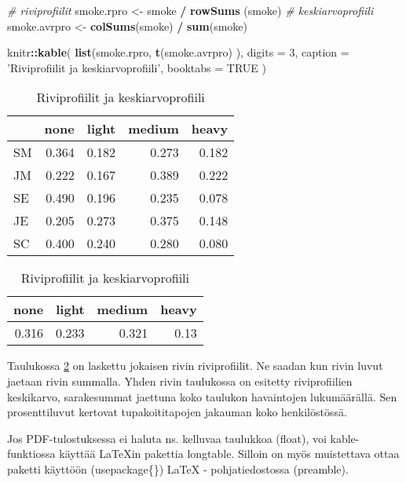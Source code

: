 \documentclass[finnish,]{book}
\newenvironment{Shaded}{\begin{snugshade}}{\end{snugshade}}
\newcommand{\CommentTok}[1]{\textcolor[rgb]{0.56,0.35,0.01}{\textit{#1}}}
\newcommand{\DataTypeTok}[1]{\textcolor[rgb]{0.13,0.29,0.53}{#1}}
\newcommand{\DecValTok}[1]{\textcolor[rgb]{0.00,0.00,0.81}{#1}}
\newcommand{\KeywordTok}[1]{\textcolor[rgb]{0.13,0.29,0.53}{\textbf{#1}}}
\newcommand{\NormalTok}[1]{#1}
\newcommand{\OperatorTok}[1]{\textcolor[rgb]{0.81,0.36,0.00}{\textbf{#1}}}
\newcommand{\OtherTok}[1]{\textcolor[rgb]{0.56,0.35,0.01}{#1}}
\newcommand{\StringTok}[1]{\textcolor[rgb]{0.31,0.60,0.02}{#1}}
\theoremstyle{definition}
\theoremstyle{definition}
\theoremstyle{definition}
\theoremstyle{remark}
\begin{document}
\begin{Shaded}
\begin{Highlighting}[]
\CommentTok{# riviprofiilit}
\NormalTok{smoke.rpro <-}\StringTok{ }\NormalTok{smoke }\OperatorTok{/}\StringTok{ }\KeywordTok{rowSums}\NormalTok{ (smoke)}
\CommentTok{# keskiarvoprofiili}
\NormalTok{smoke.avrpro <-}\StringTok{ }\KeywordTok{colSums}\NormalTok{(smoke) }\OperatorTok{/}\StringTok{ }\KeywordTok{sum}\NormalTok{(smoke)}

\NormalTok{knitr}\OperatorTok{::}\KeywordTok{kable}\NormalTok{(}
  \KeywordTok{list}\NormalTok{(smoke.rpro, }\KeywordTok{t}\NormalTok{(smoke.avrpro)   ), }\DataTypeTok{digits =} \DecValTok{3}\NormalTok{,}
  \DataTypeTok{caption =} \StringTok{'Riviprofiilit ja keskiarvoprofiili'}\NormalTok{, }\DataTypeTok{booktabs =} \OtherTok{TRUE}
\NormalTok{)}
\end{Highlighting}
\end{Shaded}

\begin{table}
\caption{\label{tab:smoketable2}Riviprofiilit ja keskiarvoprofiili}

\centering
\begin{tabular}[t]{lrrrr}
\toprule
  & none & light & medium & heavy\\
\midrule
SM & 0.364 & 0.182 & 0.273 & 0.182\\
JM & 0.222 & 0.167 & 0.389 & 0.222\\
SE & 0.490 & 0.196 & 0.235 & 0.078\\
JE & 0.205 & 0.273 & 0.375 & 0.148\\
SC & 0.400 & 0.240 & 0.280 & 0.080\\
\bottomrule
\end{tabular}
\centering
\begin{tabular}[t]{rrrr}
\toprule
none & light & medium & heavy\\
\midrule
0.316 & 0.233 & 0.321 & 0.13\\
\bottomrule
\end{tabular}
\end{table}

Taulukossa \ref{tab:smoketable2} on laskettu jokaisen rivin
riviprofiilit. Ne saadan kun rivin luvut jaetaan rivin summalla. Yhden
rivin taulukossa on esitetty riviprofiilien keskikarvo, sarakesummat
jaettuna koko taulukon havaintojen lukumäärällä. Sen prosenttiluvut
kertovat tupakoititapojen jakauman koko henkilöstössä.

Jos PDF-tulostuksessa ei haluta ns. kelluvaa taulukkoa (float), voi
kable-funktiossa käyttää LaTeXin pakettia longtable. Silloin on myös
muistettava ottaa paketti käyttöön (usepackage\{\}) LaTeX -
pohjatiedostossa (preamble).
\end{document}
